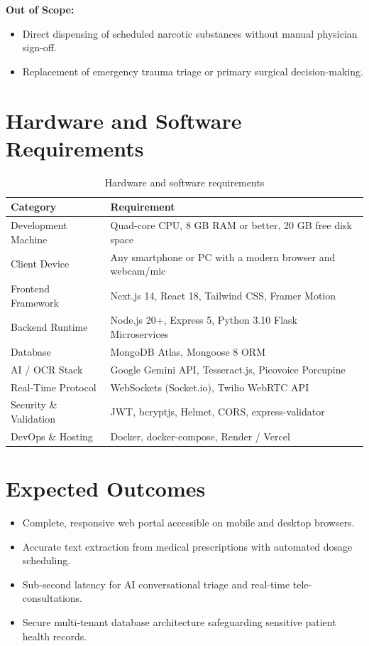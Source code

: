 \documentclass[12pt,a4paper]{report}
\begin{document}
\noindent \textbf{Out of Scope:}
\begin{itemize}
    \item Direct dispensing of scheduled narcotic substances without manual physician sign-off.
    \item Replacement of emergency trauma triage or primary surgical decision-making.
\end{itemize}

\section{Hardware and Software Requirements}
\begin{table}[htbp]
\centering
\caption{Hardware and software requirements}
\label{tab:hw_sw_req}
\begin{tabularx}{\textwidth}{p{4.2cm} X}
\toprule
\textbf{Category} & \textbf{Requirement} \\
\midrule
Development Machine & Quad-core CPU, 8 GB RAM or better, 20 GB free disk space \\
Client Device & Any smartphone or PC with a modern browser and webcam/mic \\
Frontend Framework & Next.js 14, React 18, Tailwind CSS, Framer Motion \\
Backend Runtime & Node.js 20+, Express 5, Python 3.10 Flask Microservices \\
Database & MongoDB Atlas, Mongoose 8 ORM \\
AI / OCR Stack & Google Gemini API, Tesseract.js, Picovoice Porcupine \\
Real-Time Protocol & WebSockets (Socket.io), Twilio WebRTC API \\
Security \& Validation & JWT, bcryptjs, Helmet, CORS, express-validator \\
DevOps \& Hosting & Docker, docker-compose, Render / Vercel \\
\bottomrule
\end{tabularx}
\end{table}

\section{Expected Outcomes}
\begin{itemize}
    \item Complete, responsive web portal accessible on mobile and desktop browsers.
    \item Accurate text extraction from medical prescriptions with automated dosage scheduling.
    \item Sub-second latency for AI conversational triage and real-time tele-consultations.
    \item Secure multi-tenant database architecture safeguarding sensitive patient health records.
\end{itemize}
\end{document}
